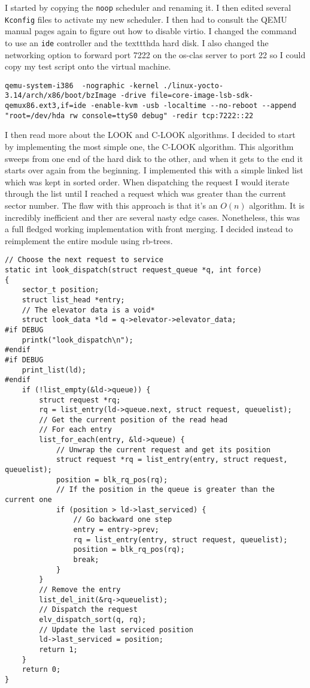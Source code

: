\documentclass[10pt,conference,draftclsnofoot,onecolumn]{IEEEtran}
\begin{document}
I started by copying the \texttt{noop} scheduler and renaming it. I then edited several \texttt{Kconfig} files to activate my new scheduler. I then had to consult the QEMU manual pages again to figure out how to disable virtio. I changed the command to use an \texttt{ide} controller  and the texttt{hda} hard disk. I also changed the networking option to forward port 7222 on the os-clas server to port 22 so I could copy my test script onto the virtual machine. \cite{qemu(1)}

\begin{lstlisting}
qemu-system-i386  -nographic -kernel ./linux-yocto-3.14/arch/x86/boot/bzImage -drive file=core-image-lsb-sdk-qemux86.ext3,if=ide -enable-kvm -usb -localtime --no-reboot --append "root=/dev/hda rw console=ttyS0 debug" -redir tcp:7222::22
\end{lstlisting}

I then read more about the LOOK and C-LOOK algorithms. I decided to start by implementing the most simple one, the C-LOOK algorithm. This algorithm sweeps from one end of the hard disk to the other, and when it gets to the end it starts over again from the beginning. I implemented this with a simple linked list which was kept in sorted order. When dispatching the request I would iterate through the list until I reached a request which was greater than the current sector number. The flaw with this approach is that it's an $O(n)$ algorithm. It is incredibly inefficient and ther are several nasty edge cases. Nonetheless, this was a full fledged working implementation with front merging. I decided instead to reimplement the entire module using rb-trees.
\begin{lstlisting}
// Choose the next request to service
static int look_dispatch(struct request_queue *q, int force)
{
    sector_t position;
    struct list_head *entry;
    // The elevator data is a void*
    struct look_data *ld = q->elevator->elevator_data;
#if DEBUG
    printk("look_dispatch\n");
#endif
#if DEBUG
    print_list(ld);
#endif
    if (!list_empty(&ld->queue)) {
        struct request *rq;
        rq = list_entry(ld->queue.next, struct request, queuelist);
        // Get the current position of the read head
        // For each entry
        list_for_each(entry, &ld->queue) {
            // Unwrap the current request and get its position
            struct request *rq = list_entry(entry, struct request, queuelist);
            position = blk_rq_pos(rq);
            // If the position in the queue is greater than the current one
            if (position > ld->last_serviced) {
                // Go backward one step
                entry = entry->prev;
                rq = list_entry(entry, struct request, queuelist);
                position = blk_rq_pos(rq);
                break;
            }
        }
        // Remove the entry
        list_del_init(&rq->queuelist);
        // Dispatch the request
        elv_dispatch_sort(q, rq);
        // Update the last serviced position
        ld->last_serviced = position;
        return 1;
    }
    return 0;
}
\end{lstlisting}
\end{document}
